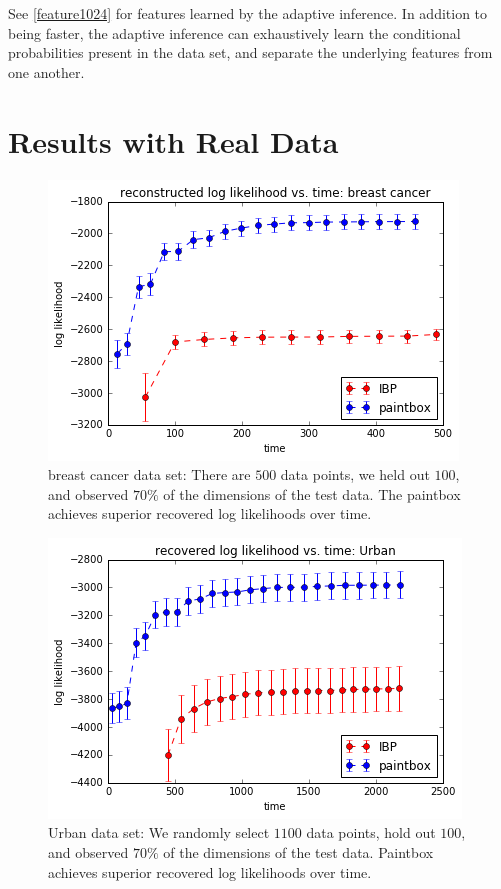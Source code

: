\documentclass{article}
\begin{document}
See \ref{feature1024} for features learned by the adaptive inference.  In addition to being faster, the adaptive inference can exhaustively learn the conditional probabilities present in the data set, and separate the underlying features from one another.  

\section{Results with Real Data}
\begin{figure}[d1]
\vskip 0.2in
\begin{center}
\centerline{\includegraphics[width=\columnwidth]{d1}}
\caption{breast cancer data set: There are $500$ data points, we held out $100$, and observed $70\%$ of the dimensions of the test data.  The paintbox achieves superior recovered log likelihoods over time.}
\label{d1}
\end{center}
\vskip -0.2in
\end{figure} 

\begin{figure}[d2] 
\vskip 0.2in
\begin{center}
\centerline{\includegraphics[width=\columnwidth]{d2}}
\caption{Urban data set: We randomly select $1100$ data points, hold out $100$, and observed $70\%$ of the dimensions of the test data.  Paintbox achieves superior recovered log likelihoods over time.}
\label{d2}
\end{center}
\vskip -0.2in
\end{figure} 
\end{document}
